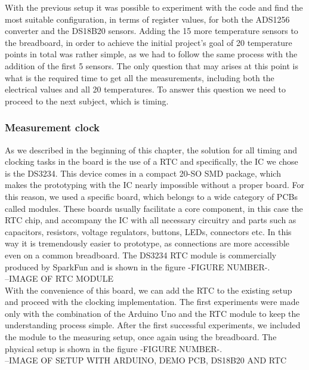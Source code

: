With the previous setup it was possible to experiment with the code and find the most suitable configuration, in terms of register values, for both the ADS1256 converter and the DS18B20 sensors. Adding the 15 more temperature sensors to the breadboard, in order to achieve the initial project's goal  of 20 temperature points in total was rather simple, as we had to follow the same process with the addition of the first 5 sensors. The only question that may arises at this point is what is the required time to get all the measurements, including both the electrical values and all 20 temperatures. To answer this question we need to proceed to the next subject, which is timing.

\subsubsection{Measurement clock}
As we described in the beginning of this chapter, the solution for all timing and clocking tasks in the board is the use of a RTC and specifically, the IC we chose is the DS3234. This device comes in a compact 20-SO SMD package, which makes the prototyping with the IC nearly impossible without a proper board. For this reason, we used a specific board, which belongs to a wide category of PCBs called modules. These boards usually facilitate a core component, in this case the RTC chip, and accompany the IC with all necessary circuitry and parts such as capacitors, resistors, voltage regulators, buttons, LEDs, connectors etc. In this way it is tremendously easier to prototype, as connections are more accessible even on a common breadboard. The DS3234 RTC module is commercially produced by SparkFun and is shown in the figure -FIGURE NUMBER-.\\

--IMAGE OF RTC MODULE\\

With the convenience of this board, we can add the RTC to the existing setup and proceed with the clocking implementation. The first experiments were made only with the combination of the Arduino Uno and the RTC module to keep the understanding process simple. After the first successful experiments, we included the module to the measuring setup, once again using the breadboard. The physical setup is shown in the figure -FIGURE NUMBER-.\\

--IMAGE OF SETUP WITH ARDUINO, DEMO PCB, DS18B20 AND RTC \\

